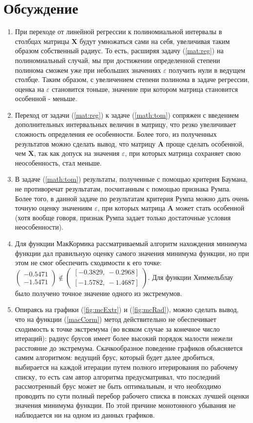 \documentclass[a4paper]{article}
\begin{document}
\section{Обсуждение}
\begin{enumerate}
    \item При переходе от линейной регрессии к полиномиальной интервалы в столбцах матрицы $\mathbf{X}$ будут умножаться сами на себя, увеличивая таким образом собственный радиус. То есть, расширяя задачу (\ref{mat:reg}) на полиномиальный случай, мы при достижении определенной степени полинома сможем уже при небольших значениях $\varepsilon$ получить нули в ведущем столбце. Таким образом, с увеличением степени полинома в задаче регрессии, оценка на $\varepsilon$ становится тоньше, значение при котором матрица становится особенной - меньше.
    \item Переход от задачи (\ref{mat:reg}) к задаче (\ref{math:tom}) сопряжен с введением дополнительных интервальных величин в матрицу, что резко увеличивает сложность определения ее особенности. Более того, из полученных результатов можно сделать вывод, что матрицу $\mathbf{A}$ проще сделать особенной, чем $\mathbf{X}$, так как допуск на значения $\varepsilon$, при которых матрица сохраняет свою неособенность, стал меньше.
    \item В задаче (\ref{math:tom}) результаты, полученные с помощью критерия Баумана, не противоречат результатам, посчитанным с помощью признака Румпа. Более того, в данной задаче по результатам критерия Румпа можно дать очень точную оценку значениям $\varepsilon$, при которых матрица $\mathbf{A}$ может стать особенной (хотя вообще говоря, признак Румпа задает только достаточные условия неособенности).
    \item Для функции МакКормика рассматриваемый алгоритм нахождения минимума функции дал правильную оценку самого значения минимума функции, но при этом не смог обеспечить сходимости к его точке: $\begin{pmatrix}
    -0.5471\\ -1.5471
    \end{pmatrix}\notin \begin{pmatrix}
    [   -0.3829,\:    -0.2968]\\ 
[   -1.5782,\:   -1.4687]
    \end{pmatrix}$. Для функции Химмельблау было получено точное значение одного из экстремумов.
    \item Опираясь на графики (\ref{fig:mcExtr}) и (\ref{fig:mcRad}), можно сделать вывод, что на функции (\ref{macCorm}) метод действительно не обеспечивает сходимость к точке экстремума (во всяком случае за конечное число итераций): радиус брусов имеет более высокий порядок малости нежели расстояние до экстремума. Скачкообразное поведение графиков объясняется самим алгоритмом: ведущий брус, который будет далее дробиться, выбирается на каждой итерации путем полного итерирования по рабочему списку, то есть сам автор алгоритма предусматривал, что последний рассмотренный брус может не быть оптимальным, и что необходимо проводить по сути полный перебор рабочего списка в поисках лучшей оценки значения минимума функции. По этой причине монотонного убывания не наблюдается ни на одном из данных графиков.

\end{enumerate}
\end{document}
